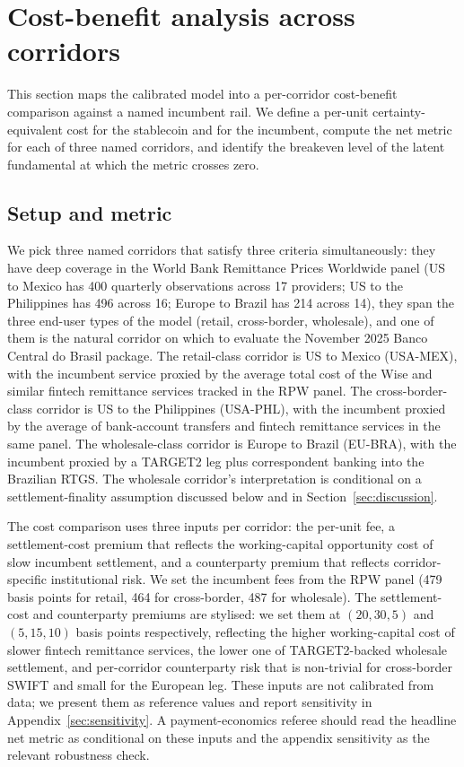 \section{Cost-benefit analysis across corridors}\label{sec:cost_benefit}

This section maps the calibrated model into a per-corridor cost-benefit comparison against a named incumbent rail. We define a per-unit certainty-equivalent cost for the stablecoin and for the incumbent, compute the net metric for each of three named corridors, and identify the breakeven level of the latent fundamental at which the metric crosses zero.

\subsection{Setup and metric}\label{sub:cb_setup}

We pick three named corridors that satisfy three criteria simultaneously: they have deep coverage in the World Bank Remittance Prices Worldwide panel (US to Mexico has 400 quarterly observations across 17 providers; US to the Philippines has 496 across 16; Europe to Brazil has 214 across 14), they span the three end-user types of the model (retail, cross-border, wholesale), and one of them is the natural corridor on which to evaluate the November 2025 Banco Central do Brasil package. The retail-class corridor is US to Mexico (USA-MEX), with the incumbent service proxied by the average total cost of the Wise and similar fintech remittance services tracked in the RPW panel. The cross-border-class corridor is US to the Philippines (USA-PHL), with the incumbent proxied by the average of bank-account transfers and fintech remittance services in the same panel. The wholesale-class corridor is Europe to Brazil (EU-BRA), with the incumbent proxied by a TARGET2 leg plus correspondent banking into the Brazilian RTGS. The wholesale corridor's interpretation is conditional on a settlement-finality assumption discussed below and in Section~\ref{sec:discussion}.

The cost comparison uses three inputs per corridor: the per-unit fee, a settlement-cost premium that reflects the working-capital opportunity cost of slow incumbent settlement, and a counterparty premium that reflects corridor-specific institutional risk. We set the incumbent fees from the RPW panel (479 basis points for retail, 464 for cross-border, 487 for wholesale). The settlement-cost and counterparty premiums are stylised: we set them at $(20, 30, 5)$ and $(5, 15, 10)$ basis points respectively, reflecting the higher working-capital cost of slower fintech remittance services, the lower one of TARGET2-backed wholesale settlement, and per-corridor counterparty risk that is non-trivial for cross-border SWIFT and small for the European leg. These inputs are not calibrated from data; we present them as reference values and report sensitivity in Appendix~\ref{sec:sensitivity}. A payment-economics referee should read the headline net metric as conditional on these inputs and the appendix sensitivity as the relevant robustness check.

